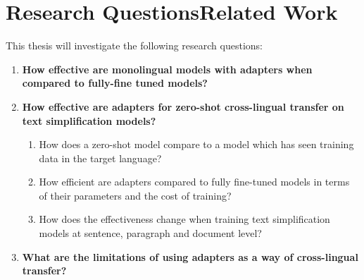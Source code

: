 \section{Research QuestionsRelated Work}
This thesis will investigate the following research questions:

\begin{enumerate}
    \item \textbf{How effective are monolingual models with adapters when compared to fully-fine tuned models?}\label{rq:1}
    \item \textbf{How effective are adapters for zero-shot cross-lingual transfer on text simplification models?}\label{rq:2}
    \begin{enumerate}
        \item How does a zero-shot model compare to a model which has seen training data in the target language?\label{rq:2.1}
        \item How efficient are adapters compared to fully fine-tuned models in terms of their parameters and the cost of training?\label{rq:2.2}
        \item How does the effectiveness change when training text simplification models at sentence, paragraph and document level?\label{rq:2.3}
    \end{enumerate}
    \item \textbf{What are the limitations of using adapters as a way of cross-lingual transfer?}\label{rq:3}
\end{enumerate}